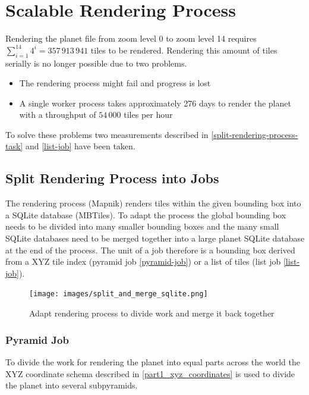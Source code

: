 \chapter{Scalable Rendering Process}

Rendering the planet file from zoom level 0 to zoom level 14 requires $\sum_{i=1}^{14} 4^i = 357\,913\,941$ tiles to be rendered. 
Rendering this amount of tiles serially is no longer possible due to two problems.

\begin{itemize}
    \item The rendering process might fail and progress is lost
    \item A single worker process takes approximately 276 days to render the planet with a throughput of $54\,000$ tiles per hour
\end{itemize}

To solve these problems two measurements described in \autoref{split-rendering-process-task} and \autoref{list-job} have been taken.

\section{Split Rendering Process into Jobs}\label{split-rendering-process-task}

The rendering process (Mapnik)
renders tiles within the given bounding box into a SQLite database (MBTiles). To adapt the process the global bounding box needs to be divided into many smaller bounding boxes and the many small SQLite databases need to be merged together into a large planet SQLite database at the end of the process.
The unit of a job therefore is a bounding box derived from a XYZ tile index (pyramid job \autoref{pyramid-job}) or a list of tiles (list job \autoref{list-job}).

\begin{figure}[H]
  \centering
  \texttt{[image: images/split\_and\_merge\_sqlite.png]}
  \caption{Adapt rendering process to divide work and merge it back together}
\end{figure}

\subsection{Pyramid Job}\label{pyramid-job}

To divide the work for rendering the planet into equal parts across the world the XYZ coordinate schema described in \autoref{part1_xyz_coordinates} is used to divide the planet into several subpyramids.

